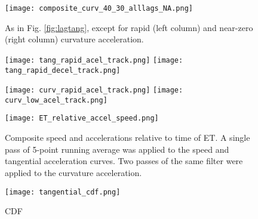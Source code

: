 \documentclass[wcd,manuscript]{copernicus}
\begin{document}
\clearpage
\begin{figure*}[t]
  \centering
    \texttt{[image: composite\_curv\_40\_30\_alllags\_NA.png]}
  \caption{As in Fig. \ref{fig:lagtang}, except for rapid (left column) and near-zero (right column) curvature acceleration.}
  \label{fig:lagcurv}
\end{figure*}

\clearpage
\begin{figure*}[t]
  \centering
    \texttt{[image: tang\_rapid\_acel\_track.png]}
     \texttt{[image: tang\_rapid\_decel\_track.png]}
  \caption{}
  \label{fig:tang_track}
\end{figure*}


\clearpage

\begin{figure*}[t]
  \centering
    \texttt{[image: curv\_rapid\_acel\_track.png]}
     \texttt{[image: curv\_low\_acel\_track.png]}
  \caption{}
  \label{fig:curv_track}
\end{figure*}





\begin{figure*}[t]
  \texttt{[image: ET\_relative\_accel\_speed.png]}
  \caption{Composite speed and accelerations relative to time of ET. A single pass of 5-point running average was applied to the speed and tangential acceleration curves. Two passes of the same filter were applied to the curvature acceleration.}\label{fig:ET_SA}
\end{figure*}



\clearpage

\begin{figure*}[t]
  \texttt{[image: tangential\_cdf.png]}
  \caption{CDF}\label{fig:tang_cdf}
\end{figure*}
\end{document}
